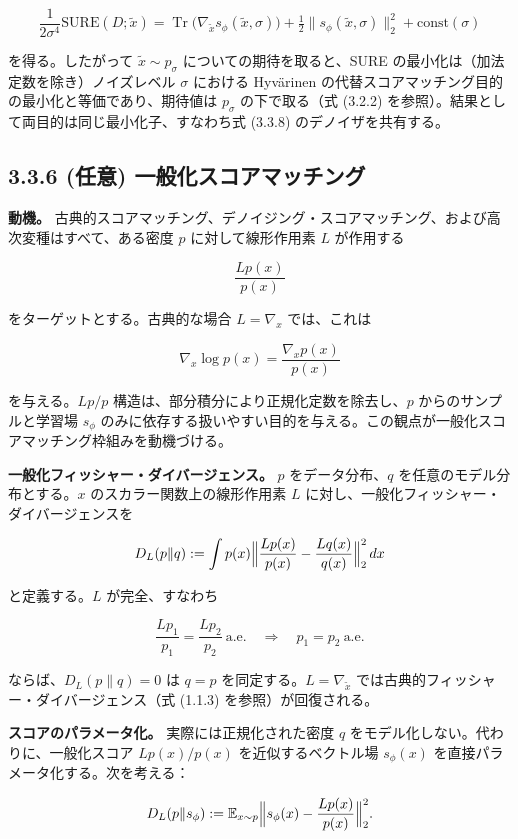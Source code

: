 \[
\frac{1}{2\sigma^4}\mathrm{SURE}(D;\tilde{x})
= \operatorname{Tr}\bigl(\nabla_{\tilde{x}} s_\phi(\tilde{x},\sigma)\bigr)
+ \tfrac{1}{2}\|s_\phi(\tilde{x},\sigma)\|_2^2 + \mathrm{const}(\sigma)
\]


を得る。したがって $\tilde{x}\sim p_\sigma$ についての期待を取ると、SURE の最小化は（加法定数を除き）ノイズレベル $\sigma$ における Hyvärinen の代替スコアマッチング目的の最小化と等価であり、期待値は $p_\sigma$ の下で取る（式 (3.2.2) を参照）。結果として両目的は同じ最小化子、すなわち式 (3.3.8) のデノイザを共有する。

\subsection*{3.3.6 (任意) 一般化スコアマッチング}


\textbf{動機。} 古典的スコアマッチング、デノイジング・スコアマッチング、および高次変種はすべて、ある密度 $p$ に対して線形作用素 $L$ が作用する

\[
\frac{Lp(x)}{p(x)}
\]


をターゲットとする。古典的な場合 $L=\nabla_x$ では、これは

\[
\nabla_x\log p(x)=\frac{\nabla_x p(x)}{p(x)}
\]


を与える。$Lp/p$ 構造は、部分積分により正規化定数を除去し、$p$ からのサンプルと学習場 $s_\phi$ のみに依存する扱いやすい目的を与える。この観点が一般化スコアマッチング枠組みを動機づける。

\textbf{一般化フィッシャー・ダイバージェンス。} $p$ をデータ分布、$q$ を任意のモデル分布とする。$x$ のスカラー関数上の線形作用素 $L$ に対し、一般化フィッシャー・ダイバージェンスを

\[
D_L(p\|q)
:= \int p(x)\Bigl\|\frac{Lp(x)}{p(x)}-\frac{Lq(x)}{q(x)}\Bigr\|_2^2\,dx
\]


と定義する。$L$ が完全、すなわち

\[
\frac{Lp_1}{p_1}=\frac{Lp_2}{p_2}\ \text{a.e.}
\quad\Longrightarrow\quad
p_1=p_2\ \text{a.e.}
\]


ならば、$D_L(p\|q)=0$ は $q=p$ を同定する。$L=\nabla_{\tilde{x}}$ では古典的フィッシャー・ダイバージェンス（式 (1.1.3) を参照）が回復される。

\textbf{スコアのパラメータ化。} 実際には正規化された密度 $q$ をモデル化しない。代わりに、一般化スコア $Lp(x)/p(x)$ を近似するベクトル場 $s_\phi(x)$ を直接パラメータ化する。次を考える：

\[
D_L(p\|s_\phi)
:= \mathbb{E}_{x\sim p}\Bigl\|s_\phi(x)-\frac{Lp(x)}{p(x)}\Bigr\|_2^2.
\]


